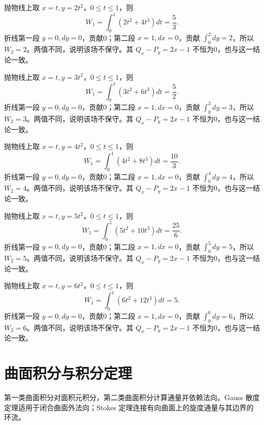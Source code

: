 \documentclass[UTF8,12pt,a4paper,fontset=fandol]{ctexart}
\begin{document}
\begin{solve}\label{ans:c42q20}
抛物线上取 $x=t,y=2t^2$，$0\le t\le1$，则
\[
W_1=\int_0^1(2t^2+4t^3)dt=\frac{5}{3}.
\]
折线第一段 $y=0,dy=0$，贡献0；第二段 $x=1,dx=0$，贡献 $\int_0^{2}dy=2$，所以 $W_2=2$。两值不同，说明该场不保守。其 $Q_x-P_y=2x-1$ 不恒为0，也与这一结论一致。
\end{solve}

\begin{solve}\label{ans:c42q21}
抛物线上取 $x=t,y=3t^2$，$0\le t\le1$，则
\[
W_1=\int_0^1(3t^2+6t^3)dt=\frac{5}{2}.
\]
折线第一段 $y=0,dy=0$，贡献0；第二段 $x=1,dx=0$，贡献 $\int_0^{3}dy=3$，所以 $W_2=3$。两值不同，说明该场不保守。其 $Q_x-P_y=2x-1$ 不恒为0，也与这一结论一致。
\end{solve}

\begin{solve}\label{ans:c42q22}
抛物线上取 $x=t,y=4t^2$，$0\le t\le1$，则
\[
W_1=\int_0^1(4t^2+8t^3)dt=\frac{10}{3}.
\]
折线第一段 $y=0,dy=0$，贡献0；第二段 $x=1,dx=0$，贡献 $\int_0^{4}dy=4$，所以 $W_2=4$。两值不同，说明该场不保守。其 $Q_x-P_y=2x-1$ 不恒为0，也与这一结论一致。
\end{solve}

\begin{solve}\label{ans:c42q23}
抛物线上取 $x=t,y=5t^2$，$0\le t\le1$，则
\[
W_1=\int_0^1(5t^2+10t^3)dt=\frac{25}{6}.
\]
折线第一段 $y=0,dy=0$，贡献0；第二段 $x=1,dx=0$，贡献 $\int_0^{5}dy=5$，所以 $W_2=5$。两值不同，说明该场不保守。其 $Q_x-P_y=2x-1$ 不恒为0，也与这一结论一致。
\end{solve}

\begin{solve}\label{ans:c42q24}
抛物线上取 $x=t,y=6t^2$，$0\le t\le1$，则
\[
W_1=\int_0^1(6t^2+12t^3)dt=5.
\]
折线第一段 $y=0,dy=0$，贡献0；第二段 $x=1,dx=0$，贡献 $\int_0^{6}dy=6$，所以 $W_2=6$。两值不同，说明该场不保守。其 $Q_x-P_y=2x-1$ 不恒为0，也与这一结论一致。
\end{solve}

\clearpage
\section{曲面积分与积分定理}\label{sec:ch43}
第一类曲面积分对面积元积分，第二类曲面积分计算通量并依赖法向。Gauss 散度定理适用于闭合曲面外法向；Stokes 定理连接有向曲面上的旋度通量与其边界的环流。
\end{document}
